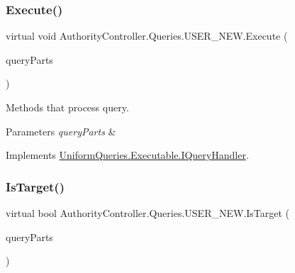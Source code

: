 \mbox{\label{class_authority_controller_1_1_queries_1_1_u_s_e_r___n_e_w_a05ffc1bd68a9d937aee817c05f273005}} 
\subsubsection{\texorpdfstring{Execute()}{Execute()}}
{\footnotesize\ttfamily virtual void Authority\+Controller.\+Queries.\+U\+S\+E\+R\+\_\+\+N\+E\+W.\+Execute (\begin{DoxyParamCaption}\item[{\mbox{\hyperlink{struct_uniform_queries_1_1_query_part}{Query\+Part}} \mbox{[}$\,$\mbox{]}}]{query\+Parts }\end{DoxyParamCaption})\hspace{0.3cm}{\ttfamily [virtual]}}



Methods that process query. 


\begin{DoxyParams}{Parameters}
{\em query\+Parts} & \\
\hline
\end{DoxyParams}


Implements \mbox{\hyperlink{interface_uniform_queries_1_1_executable_1_1_i_query_handler_a3268d72c0388f5e3debba4d73bdfe523}{Uniform\+Queries.\+Executable.\+I\+Query\+Handler}}.

\mbox{\label{class_authority_controller_1_1_queries_1_1_u_s_e_r___n_e_w_a279a4acc2e4cad572f9760e62062d8e8}} 
\subsubsection{\texorpdfstring{Is\+Target()}{IsTarget()}}
{\footnotesize\ttfamily virtual bool Authority\+Controller.\+Queries.\+U\+S\+E\+R\+\_\+\+N\+E\+W.\+Is\+Target (\begin{DoxyParamCaption}\item[{\mbox{\hyperlink{struct_uniform_queries_1_1_query_part}{Query\+Part}} \mbox{[}$\,$\mbox{]}}]{query\+Parts }\end{DoxyParamCaption})\hspace{0.3cm}{\ttfamily [virtual]}}



